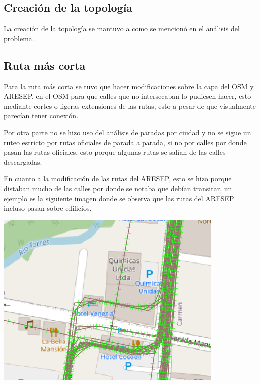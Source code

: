 \subsection{Creación de la topología}
La creación de la topología se mantuvo a como se mencionó en el análisis del problema.

\subsection{Ruta más corta}
Para la ruta más corta se tuvo que hacer modificaciones sobre la capa del OSM y ARESEP, en el OSM para que calles que no intersecaban lo pudiesen hacer, esto mediante cortes o ligeras extensiones de las rutas, esto a pesar de que visualmente parecían tener conexión.

Por otra parte no se hizo uso del análisis de paradas por ciudad y no se sigue un ruteo estricto por rutas oficiales de parada a parada, si no por calles por donde pasan las rutas oficiales, esto porque algunas rutas se salían de las calles descargadas.

En cuanto a la modificación de las rutas del ARESEP, esto se hizo porque distaban mucho de las calles por donde se notaba que debían transitar, un ejemplo es la siguiente imagen donde se observa que las rutas del ARESEP incluso pasan sobre edificios.

\begin{center}
	\includegraphics[scale=.65]{imagenes/ruta_aresep.png}
\end{center}

\newpage
